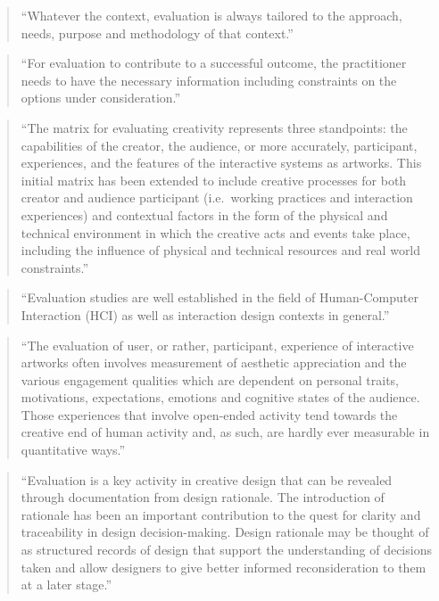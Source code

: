 \begin{quote}
  ``Whatever the context, evaluation is always tailored to the approach, needs, purpose and methodology of that context.'' \parencite[p.7]{Candy2012}
\end{quote}

\begin{quote}
  ``For evaluation to contribute to a successful outcome, the practitioner needs to have the necessary information including constraints on the options under consideration.'' \parencite[p.7]{Candy2012}
\end{quote}

\begin{quote}
  ``The matrix for evaluating creativity represents three standpoints: the capabilities of the creator, the audience, or more accurately, participant, experiences, and the features of the interactive systems as artworks. This initial matrix has been extended to include creative processes for both creator and audience participant (i.e.\ working practices and interaction experiences) and contextual factors in the form of the physical and technical environment in which the creative acts and events take place, including the influence of physical and technical resources and real world constraints.'' \parencite[p.7-8]{Candy2012}
\end{quote}

\begin{quote}
  ``Evaluation studies are well established in the field of Human-Computer Interaction (HCI) as well as interaction design contexts in general.'' \parencite[p.8]{Candy2012}
\end{quote}

\begin{quote}
  ``The evaluation of user, or rather, participant, experience of interactive artworks often involves measurement of aesthetic appreciation and the various engagement qualities which are dependent on personal traits, motivations, expectations, emotions and cognitive states of the audience. Those experiences that involve open-ended activity tend towards the creative end of human activity and, as such, are hardly ever measurable in quantitative ways.''  \parencite[p.8]{Candy2012}
\end{quote}

\begin{quote}
  ``Evaluation is a key activity in creative design that can be revealed through documentation from design rationale. The introduction of rationale has been an important contribution to the quest for clarity and traceability in design decision-making. Design rationale may be thought of as structured records of design that support the understanding of decisions taken and allow designers to give better informed reconsideration to them at a later stage.'' \parencite[p.9]{Candy2012}
\end{quote}

